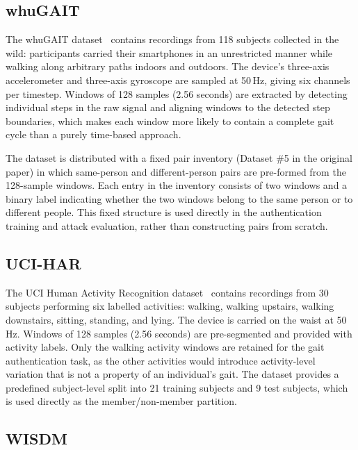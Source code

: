\subsection{whuGAIT}
\label{ssec:sys_whugait}

The whuGAIT dataset~\cite{zou2020deep} contains recordings from 118 subjects collected in the wild: participants carried their smartphones in an unrestricted manner while walking along arbitrary paths indoors and outdoors. The device's three-axis accelerometer and three-axis gyroscope are sampled at 50\,Hz, giving six channels per timestep. Windows of 128 samples (2.56 seconds) are extracted by detecting individual steps in the raw signal and aligning windows to the detected step boundaries, which makes each window more likely to contain a complete gait cycle than a purely time-based approach.

The dataset is distributed with a fixed pair inventory (Dataset \#5 in the original paper) in which same-person and different-person pairs are pre-formed from the 128-sample windows. Each entry in the inventory consists of two windows and a binary label indicating whether the two windows belong to the same person or to different people. This fixed structure is used directly in the authentication training and attack evaluation, rather than constructing pairs from scratch.

\subsection{UCI-HAR}
\label{ssec:sys_ucihar}

The UCI Human Activity Recognition dataset~\cite{anguita2013human} contains recordings from 30 subjects performing six labelled activities: walking, walking upstairs, walking downstairs, sitting, standing, and lying. The device is carried on the waist at 50\,Hz. Windows of 128 samples (2.56 seconds) are pre-segmented and provided with activity labels. Only the walking activity windows are retained for the gait authentication task, as the other activities would introduce activity-level variation that is not a property of an individual's gait. The dataset provides a predefined subject-level split into 21 training subjects and 9 test subjects, which is used directly as the member/non-member partition.

\subsection{WISDM}
\label{ssec:sys_wisdm}


